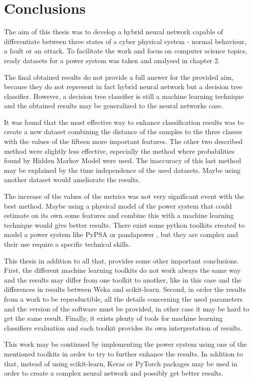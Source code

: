 \chapter{Conclusions}

The aim of this thesis was to develop a hybrid neural network capable of differentiate between three states of a cyber physical system - normal behaviour, a fault or an attack. To facilitate the work and focus on computer science topics, ready datasets for a power system was taken and analysed in chapter 2. 

The final obtained results do not provide a full answer for the provided aim, because they do not represent in fact hybrid neural network but a decision tree classifier. However, a decision tree classifier is still a machine learning technique and the obtained results may be generalized to the neural networks case.

It was found that the most effective way to enhance classification results was to create a new dataset combining the distance of the samples to the three classes with the values of the fifteen more important features. The other two described method were slightly less effective, especially the method where probabilities found by Hidden Markov Model were used. The inaccuracy of this last method may be explained by the time independence of the used datasets. Maybe using another dataset would ameliorate the results.

The increase of the values of the metrics was not very significant event with the best method. Maybe using a physical model of the power system that could estimate on its own some features and combine this with a machine learning technique would give better results. There exist some python toolkits created to model a power system like PyPSA \cite{brown_pypsapypsa_2020} or pandapower \cite{noauthor_pandapower_nodate}, but they are complex and their use require a specific technical skills.

This thesis in addition to all that, provides some other important conclusions. First, the different machine learning toolkits do not work always the same way and the results may differ from one toolkit to another, like in this case and the differences in results between Weka and scikit-learn. Second, in order the results from a work to be reproductible, all the details concerning the used parameters and the version of the software must be provided, in other case it may be hard to get the same result. Finally, it exists plenty of tools for machine learning classifiers evaluation and each toolkit provides its own interpretation of results.

This work may be continued by implementing the power system using one of the mentioned toolkits in order to try to further enhance the results. In addition to that, instead of using scikit-learn, Keras \cite{noauthor_keras_nodate} or PyTorch \cite{noauthor_pytorch_nodate} packages may be used in order to create a complex neural network and possibly get better results.   